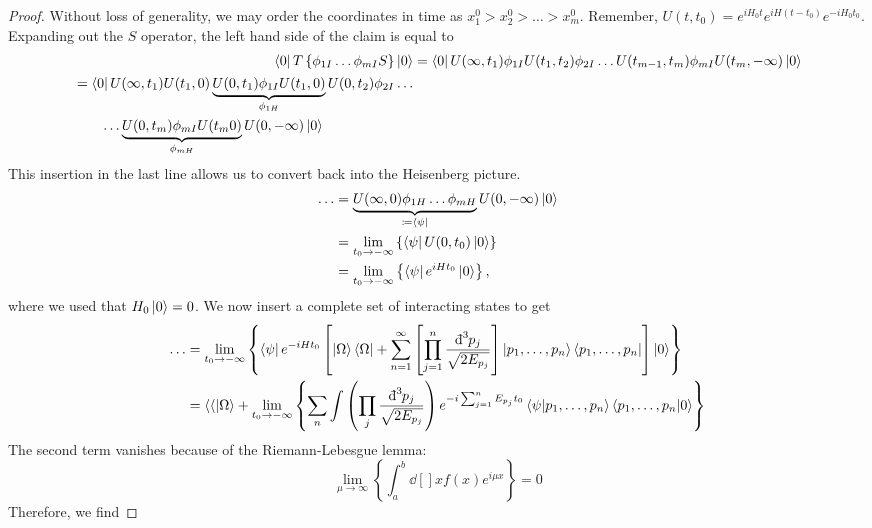 \begin{proof}
  Without loss of generality, we may order the coordinates in time as $x_1^0 > x_2^0 > \dots > x_m^0$.
  Remember, $U(t, t_0) = e^{iH_0 t} e^{iH(t - t_0)} e^{-i H_0 t_0}$.
  Expanding out the $S$ operator, the left hand side of the claim is equal to
  \begin{align}
    \bra{0} T \left\{ \phi_{1I} \dots \phi_{mI} S \right\} \ket{0} &=
    \bra{0} U(\infty, t_1) \phi_{1I} U(t_1, t_2) \phi_{2I} \dots U(t_{m-1}, t_m) \phi_{mI} U(t_m, -\infty) \ket{0} \\
    \begin{split}
      &= \bra{0} U(\infty, t_1) U(t_1, 0) \underbrace{U(0, t_1) \phi_{1I} U(t_1, 0)}_{\phi_{1H}} U(0, t_2) \phi_{2I} \dots \\
      & \qquad \dots \underbrace{U(0, t_m) \phi_{mI} U(t_m 0)}_{\phi_{mH}} U(0, -\infty) \ket{0}
    \end{split}
  \end{align}
  This insertion in the last line allows us to convert back into the Heisenberg picture.
  \begin{align}
    \dots &= \underbrace{U(\infty, 0) \phi_{1H} \dots \phi_{mH}}_{\coloneqq \bra{\psi}} U(0, -\infty) \ket{0} \\
	  &= \lim_{t_0 \to -\infty} \left\{ \bra{\psi} U(0, t_0) \ket{0} \right\} \\
	  &= \lim_{t_0 \to -\infty} \left\{ \bra{\psi} e^{i H t_0} \ket{0} \right\},
  \end{align}
  where we used that $H_0 \ket{0} = 0$. We now insert a complete set of interacting states to get
  \begin{align}
    \dots &= \lim_{t_0 \to - \infty} \left\{ \bra{\psi} e^{-i Ht_0} \left[ \ket{\Omega} \bra{\Omega} + \sum_{n=1}^\infty \left[ \prod_{j=1}^n \frac{\bdd[3]{p_j}}{\sqrt{2E_{p_j}}} \right] \ket{p_1, \dots, p_n} \bra{p_1, \dots, p_n} \right] \ket{0} \right\}  \\
	  &= \bra{\langle} \ket{\Omega} + \lim_{t_0 \to -\infty} \left\{ \sum_n \int \left( \prod_j \frac{\bdd[3]{p_j}}{\sqrt{2E_{p_j}}} \right) e^{-i \sum_{j=1}^n E_{p_j} t_0} \bra{\psi} \ket{p_1, \dots, p_n}\bra{p_1, \dots, p_n} \ket{0} \right\}
  \end{align}
  The second term vanishes because of the Riemann-Lebesgue lemma:
  \begin{equation}
    \lim_{\mu \to \infty} \left\{ \int_{a}^{b}  \dd[]{x} f(x) e^{i\mu x} \right\} = 0
  \end{equation}
  Therefore, we find 

\end{proof}
